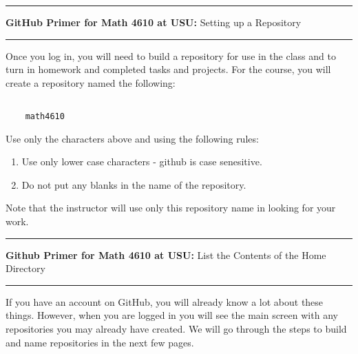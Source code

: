 \documentclass[10pt,fleqn]{article}
\begin{document}
\vskip0.1in\hrule\vskip0.1in
\noindent
{{\bf GitHub Primer for Math 4610 at USU:} Setting up a Repository} 
\vskip0.1in\hrule\vskip0.1in
\noindent
Once you log in, you will need to build a repository for use in the class and
to turn in homework and completed tasks and projects. For the course, you will
create a repository named the following:
\begin{verbatim}

    math4610

\end{verbatim}
Use only the characters above and using the following rules:
\begin{enumerate}
  \item Use only lower case characters - github is case senesitive.
  \item Do not put any blanks in the name of the repository.
\end{enumerate}
Note that the instructor will use only this repository name in looking for your
work.
\vskip0.1in\hrule\vskip0.1in
\noindent
{{\bf Github Primer for Math 4610 at USU:} List the Contents of the Home
    Directory} 
\vskip0.1in\hrule\vskip0.1in
\noindent
If you have an account on GitHub, you will already know a lot about these
things. However, when you are logged in you will see the main screen with any
repositories you may already have created. We will go through the steps to
build and name repositories in the next few pages.

\end{document}
